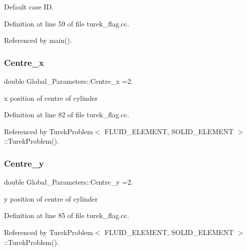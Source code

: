 Default case ID. 



Definition at line 59 of file turek\+\_\+flag.\+cc.



Referenced by main().

\mbox{\label{namespaceGlobal__Parameters_a0f0247cc83ba202413b50e7b4b7fceb0}} 
\subsubsection{\texorpdfstring{Centre\+\_\+x}{Centre\_x}}
{\footnotesize\ttfamily double Global\+\_\+\+Parameters\+::\+Centre\+\_\+x =2.}



x position of centre of cylinder 



Definition at line 82 of file turek\+\_\+flag.\+cc.



Referenced by Turek\+Problem$<$ F\+L\+U\+I\+D\+\_\+\+E\+L\+E\+M\+E\+N\+T, S\+O\+L\+I\+D\+\_\+\+E\+L\+E\+M\+E\+N\+T $>$\+::\+Turek\+Problem().

\mbox{\label{namespaceGlobal__Parameters_af41282d812fdff4867e3d8c825886290}} 
\subsubsection{\texorpdfstring{Centre\+\_\+y}{Centre\_y}}
{\footnotesize\ttfamily double Global\+\_\+\+Parameters\+::\+Centre\+\_\+y =2.}



y position of centre of cylinder 



Definition at line 85 of file turek\+\_\+flag.\+cc.



Referenced by Turek\+Problem$<$ F\+L\+U\+I\+D\+\_\+\+E\+L\+E\+M\+E\+N\+T, S\+O\+L\+I\+D\+\_\+\+E\+L\+E\+M\+E\+N\+T $>$\+::\+Turek\+Problem().

